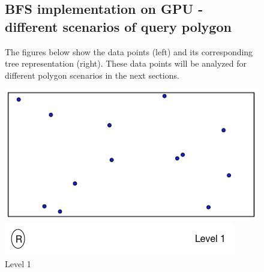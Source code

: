 \documentclass{article}
\begin{document}
\begin{figure}[ht]
 \subsection{BFS implementation on GPU - different scenarios of query polygon}


 
 The figures below show the data points (left) and its corresponding tree representation (right). These data points will be analyzed for different polygon scenarios in the next sections.
 
  \caption{Level 1}
  \centering
  \begin{minipage}[b]{0.35\textwidth}
    \includegraphics[width=\textwidth]{Quadtree_basic_scenario1}
  \end{minipage}
  \hfill
  \begin{minipage}[b]{0.6\textwidth}
    \includegraphics[width=\textwidth]{1_1Quad_1_tree}
  \end{minipage}
\end{figure}
\end{document}
